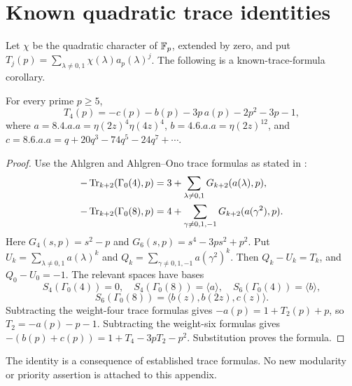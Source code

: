 \section{Known quadratic trace identities}\label{app:quadratic}
Let $\chi$ be the quadratic character of $\mathbb F_p$, extended by zero, and put $T_j(p)=\sum_{\lambda\ne0,1}\chi(\lambda)a_p(\lambda)^j$. The following is a known-trace-formula corollary.
\begin{theorem}\label{thm:quadratic}
For every prime $p\ge5$,
\[
 T_4(p)=-c(p)-b(p)-3p\,a(p)-2p^2-3p-1,
\]
where $a=8.4.a.a=\eta(2z)^4\eta(4z)^4$,
$b=4.6.a.a=\eta(2z)^{12}$, and
$c=8.6.a.a=q+20q^3-74q^5-24q^7+\cdots$.
\end{theorem}
\begin{proof}
Use the Ahlgren and Ahlgren--Ono trace formulas as stated in
\cite[Theorem 2.3]{Grove}:
\begin{align*}
 -\operatorname{Tr}_{k+2}(\Gamma_0(4),p)&=3+\sum_{\lambda\ne0,1}G_{k+2}(a(\lambda),p),\\
 -\operatorname{Tr}_{k+2}(\Gamma_0(8),p)&=4+\sum_{\gamma\ne0,1,-1}G_{k+2}(a(\gamma^2),p).
\end{align*}
Here $G_4(s,p)=s^2-p$ and $G_6(s,p)=s^4-3ps^2+p^2$.
Put $U_k=\sum_{\lambda\ne0,1}a(\lambda)^k$ and
$Q_k=\sum_{\gamma\ne0,1,-1}a(\gamma^2)^k$. Then
$Q_k-U_k=T_k$, and $Q_0-U_0=-1$.
The relevant spaces have bases
\[
 S_4(\Gamma_0(4))=0,\quad S_4(\Gamma_0(8))=\langle a\rangle,
\quad S_6(\Gamma_0(4))=\langle b\rangle,
\]
\[
 S_6(\Gamma_0(8))=\langle b(z),b(2z),c(z)\rangle.
\]
Subtracting the weight-four trace formulas gives
$-a(p)=1+T_2(p)+p$, so $T_2=-a(p)-p-1$.
Subtracting the weight-six formulas gives
$-(b(p)+c(p))=1+T_4-3pT_2-p^2$.
Substitution proves the formula.
\end{proof}

The identity is a consequence of established trace formulas. No new
modularity or priority assertion is attached to this appendix.

